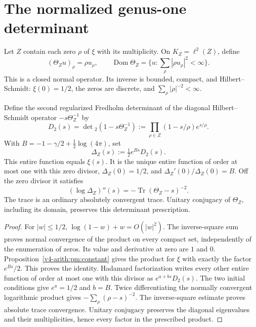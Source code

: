 \section{The normalized genus-one determinant}
\label{v4-arith:sc:determinant}

Let $Z$ contain each zero $\rho$ of $\xi$ with its multiplicity.
On $K_Z=\ell^2(Z)$, define
\[
 (\Theta_Zu)_\rho=\rho u_\rho,\qquad
 \operatorname{Dom}\Theta_Z=\{u:\sum_\rho|\rho u_\rho|^2<\infty\}.
\]
This is a closed normal operator. Its inverse is bounded, compact,
and Hilbert--Schmidt: $\xi(0)=1/2$, the zeros are discrete, and
$\sum_\rho|\rho|^{-2}<\infty$.

\begin{theorem}
\label{v4-arith:sc:normalized-det}
Define the second regularized Fredholm determinant of the diagonal
Hilbert--Schmidt operator $-s\Theta_Z^{-1}$ by
\[
 D_2(s)=\det{}_2(1-s\Theta_Z^{-1})
       :=\prod_{\rho\in Z}(1-s/\rho)e^{s/\rho}.
\]
With $B=-1-\gamma/2+\tfrac12\log(4\pi)$, set
\begin{equation}
 \Delta_Z(s):=\tfrac12e^{Bs}D_2(s).
 \label{v4-arith:sc:normalized-det-formula}
\end{equation}
This entire function equals $\xi(s)$.
It is the unique entire function of order at most one with this
zero divisor, $\Delta_Z(0)=1/2$, and $\Delta_Z'(0)/\Delta_Z(0)=B$.
Off the zero divisor it satisfies
\[
 (\log\Delta_Z)''(s)
       =-\operatorname{Tr}(\Theta_Z-s)^{-2}.
\]
The trace is an ordinary absolutely convergent trace.
Unitary conjugacy of $\Theta_Z$, including its domain, preserves
this determinant prescription.
\end{theorem}
\begin{proof}
For $|w|\le1/2$, $\log(1-w)+w=O(|w|^2)$.
The inverse-square sum proves normal convergence of the product
on every compact set, independently of the enumeration of zeros.
Its value and derivative at zero are $1$ and $0$.
Proposition~\ref{v4-arith:pm:constant} gives the product for $\xi$
with exactly the factor $e^{Bs}/2$. This proves the identity.
Hadamard factorization writes every other entire function of order
at most one with this divisor as $e^{a+bs}D_2(s)$.
The two initial conditions give $e^a=1/2$ and $b=B$.
Twice differentiating the normally convergent logarithmic product
gives $-\sum_\rho(\rho-s)^{-2}$.
The inverse-square estimate proves absolute trace convergence.
Unitary conjugacy preserves the diagonal eigenvalues and their
multiplicities, hence every factor in the prescribed product.
\end{proof}

